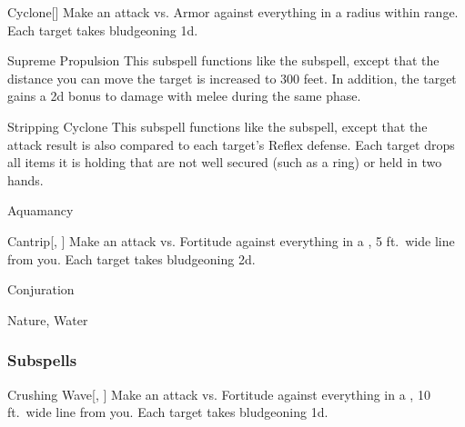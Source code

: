 \begin{ability}[\nth{4}]{Cyclone}[]
Make an attack vs. Armor against everything in a \areamed radius within \rngmed range.
\hit Each target takes bludgeoning  \minus1d.
\end{ability}
\vspace{0.25em}


\begin{ability}[\nth{4}]{Supreme Propulsion}
This subspell functions like the  subspell, except that the distance you can move the target is increased to 300 feet.
In addition, the target gains a \plus2d bonus to damage with melee  during the same phase.
\end{ability}
\vspace{0.25em}


\begin{ability}[\nth{6}]{Stripping Cyclone}
This subspell functions like the  subspell, except that the attack result is also compared to each target's Reflex defense.
\hit Each target drops all items it is holding that are not well secured (such as a ring) or held in two hands.
\end{ability}
\vspace{0.25em}

\newpage
\begin{spellsection}{Aquamancy}

\begin{spellheader}
\end{spellheader}


\begin{ability}{Cantrip}[, ]
Make an attack vs. Fortitude against everything in a \areamed, 5 ft.\ wide line from you.
\hit Each target takes bludgeoning  \minus2d.
\end{ability}




 Conjuration

 Nature, Water
\end{spellsection}


\subsubsection{Subspells}


\begin{ability}[\nth{1}]{Crushing Wave}[, ]
Make an attack vs. Fortitude against everything in a \arealarge, 10 ft.\ wide line from you.
\hit Each target takes bludgeoning  \minus1d.
\end{ability}
\vspace{0.25em}


